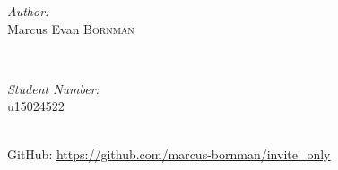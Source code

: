 \begin{titlepage}
\begin{minipage}{0.4\textwidth}
\begin{flushleft} \large
\emph{Author:}\\
Marcus Evan \textsc{Bornman}
\end{flushleft}
\end{minipage}
~
\begin{minipage}{0.4\textwidth}
\begin{flushright} \large
\emph{Student Number:} \\
u15024522
\end{flushright}
\end{minipage}\\[1cm]

\small GitHub:
\url{https://github.com/marcus-bornman/invite_only}

\end{titlepage}